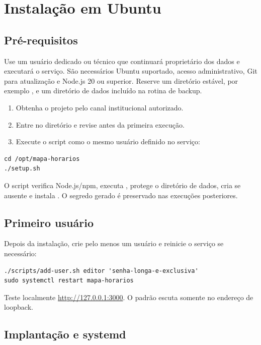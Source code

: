 \chapter{Instalação em Ubuntu}

\section{Pré-requisitos}

Use um usuário dedicado ou técnico que continuará proprietário dos dados e executará o serviço. São necessários Ubuntu suportado, acesso administrativo, Git para atualização e Node.js 20 ou superior. Reserve um diretório estável, por exemplo , e um diretório de dados incluído na rotina de backup.

\begin{enumerate}
  \item Obtenha o projeto pelo canal institucional autorizado.
  \item Entre no diretório e revise  antes da primeira execução.
  \item Execute o script como o mesmo usuário definido no serviço:
\end{enumerate}

\begin{lstlisting}
cd /opt/mapa-horarios
./setup.sh
\end{lstlisting}

O script verifica Node.js/npm, executa , protege o diretório de dados, cria  se ausente e instala . O segredo gerado é preservado nas execuções posteriores.

\section{Primeiro usuário}

Depois da instalação, crie pelo menos um usuário e reinicie o serviço se necessário:

\begin{lstlisting}
./scripts/add-user.sh editor 'senha-longa-e-exclusiva'
sudo systemctl restart mapa-horarios
\end{lstlisting}

Teste localmente \url{http://127.0.0.1:3000}. O padrão escuta somente no endereço de loopback.

\section{Implantação e systemd}

